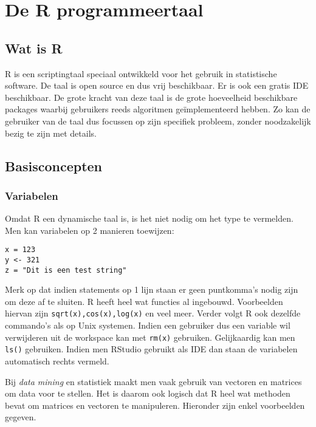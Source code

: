 \chapter{De R programmeertaal}
\section{Wat is R}
R is een scriptingtaal speciaal ontwikkeld voor het gebruik in statistische software. De taal is open source en dus vrij beschikbaar. Er is ook een gratis IDE beschikbaar. De grote kracht van deze taal is de grote hoeveelheid beschikbare packages waarbij gebruikers reeds algoritmen ge\"implementeerd hebben. Zo kan de gebruiker van de taal dus focussen op zijn specifiek probleem, zonder noodzakelijk bezig te zijn met details.
\section{Basisconcepten}
\subsection{Variabelen}
Omdat R een dynamische taal is, is het niet nodig om het type te vermelden. Men kan variabelen op 2 manieren toewijzen:
\begin{verbatim}
x = 123
y <- 321
z = "Dit is een test string"
\end{verbatim}
Merk op dat indien statements op 1 lijn staan er geen puntkomma's nodig zijn om deze af te sluiten. R heeft heel wat functies al ingebouwd. Voorbeelden hiervan zijn \texttt{sqrt(x),cos(x),log(x)} en veel meer. Verder volgt R ook dezelfde commando's als op Unix systemen. Indien een gebruiker dus een variable wil verwijderen uit de workspace kan met \texttt{rm(x)} gebruiken. Gelijkaardig kan men \texttt{ls()} gebruiken. Indien men RStudio gebruikt als IDE dan staan de variabelen automatisch rechts vermeld.

Bij \emph{data mining} en statistiek maakt men vaak gebruik van vectoren en matrices om data voor te stellen. Het is daarom ook logisch dat R heel wat methoden bevat om matrices en vectoren te manipuleren. Hieronder zijn enkel voorbeelden gegeven.
\newpage
